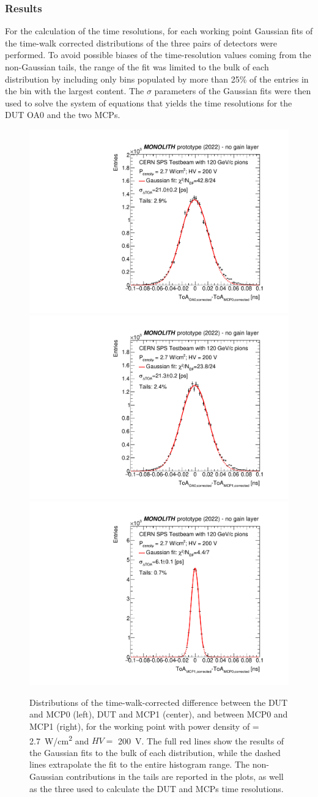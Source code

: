 		\subsubsection{Results}
		For the calculation of the time resolutions, for each working point Gaussian fits of the  time-walk corrected \dtoa distributions of the three pairs of detectors were performed.
		To avoid possible biases of the time-resolution values coming from the non-Gaussian tails, the range of the fit was limited to the bulk of each \dtoa distribution by including only bins populated by more than 25\% of the entries in the bin with the largest content. The $\sigma$ parameters of the Gaussian fits were then used to solve the system of equations that yields the time resolutions for the DUT OA0 and the two MCPs. 

		\begin{figure}[h]
			\centering 
			\includegraphics[width=.33\textwidth,trim=40 20 30 20]{files/MONOLITH_paper/TOF_1.pdf}
			\includegraphics[width=.33\textwidth,trim=40 20 30 20]{files/MONOLITH_paper/TOF_2.pdf}
			\includegraphics[width=.33\textwidth,trim=40 20 30 20]{files/MONOLITH_paper/TOF_3.pdf}
			\caption{Distributions of the time-walk-corrected \dtoa difference between the DUT and MCP0 (left), DUT and MCP1 (center), and between MCP0 and MCP1 (right), for the working point with power density of  \power = \SI{2.7}{\watt/\centi\meter^2} and $ HV =$ \SI{200}{\volt}. The full red lines show the results of the Gaussian fits to the bulk of each distribution, while the dashed lines extrapolate the fit to the entire histogram range. The non-Gaussian contributions in the tails are reported in the plots, as well as the three \sigdtoa used to calculate the DUT and MCPs time resolutions.}
			\label{im:MONO_TOF_fits} 
		\end{figure}

